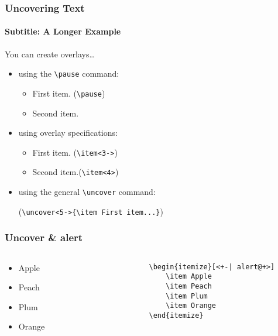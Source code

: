 \begin{frame}[fragile]
	\frametitle{Uncovering Text}
	\framesubtitle{Subtitle: A Longer Example}
	
	You can create overlays\dots
	\begin{itemize}
		\item using the \verb+\pause+ command:
		\begin{itemize}
			\item
			First item. (\verb+\pause+)
			\pause
			\item    
			Second item.
		\end{itemize}
		\item
		using overlay specifications: 
		\begin{itemize}
			\item<3->
			First item. (\verb+\item<3->+)
			\item<4>
			Second item.(\verb+\item<4>+)
		\end{itemize}
		\item
		using the general \verb+\uncover+ command:
		
		(\verb+\uncover<5->{\item First item...}+)
		\begin{itemize}
		\end{itemize}
	\end{itemize}
\end{frame}



\begin{frame}[fragile]
	\frametitle{Uncover \& alert}
	\begin{columns}[c]
		\begin{column}{.3\textwidth}
			\begin{itemize}[<+-| alert@+>]
				\item Apple
				\item Peach
				\item Plum
				\item Orange
			\end{itemize}
		\end{column}
		\begin{column}{.7\textwidth}
			\begin{verbatim}
				\begin{itemize}[<+-| alert@+>]
					\item Apple
					\item Peach
					\item Plum
					\item Orange
				\end{itemize}
			\end{verbatim}
		\end{column}
		
	\end{columns}
\end{frame}

